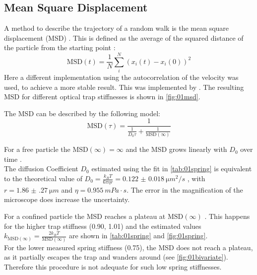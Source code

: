 \documentclass[
    twoside=false,
    twocolumn=true,
    fontsize=11pt,
]{scrarticle}
\begin{document}
\subsection*{Mean Square Displacement}
A method to describe the trajectory of a random walk is the mean square displacement (MSD) \cite{wiki:msd}.
This is defined as the average of the squared distance of the particle from the starting point \cite{wiki:msd}:
\begin{equation}
    \text{MSD}(t) = \frac{1}{N} \sum_i^N \left( x_i\left(t\right) - x_i\left(0\right) \right)^2 
\end{equation}
Here a different implementation using the autocorrelation of the velocity was used, to achieve a more stable result.
This was implemented by \cite{jl:msd}.
The resulting MSD for different optical trap stiffnesses is shown in \autoref{fig:01msd}.

The MSD can be described by the following model:
\begin{equation}
    \text{MSD}(\tau) = \frac{1}{\frac{1}{D_0 \tau} + \frac{1}{\text{MSD}(\infty)}}
    \label{eq:01_mdl_msd} 
\end{equation}

For a free particle the $\text{MSD}(\infty)=\infty$ and the MSD grows linearly with $D_0$ over time \cite{wiki:msd,instructions}.\\
The diffusion Coefficient $D_0$ estimated using the fit in \autoref{tab:01spring} is equivalent to the theoretical value of $D_0 = \frac{k_B T}{6 \pi \eta r} = \SI{0.122(18)}{\micro m ^2 / s}$ \cite{instructions}, with $r = \SI{1.86(27)}{\micro m}$ and $\eta = \SI{0.955}{mPa\cdot s}$\cite{n:water}.
The error in the magnification of the microscope does increase the uncertainty.

For a confined particle the MSD reaches a plateau at $\text{MSD}(\infty)$ \cite{instructions}.
This happens for the higher trap stiffness (\SI{0.90}{}, \SI{1.01}{}) and the estimated values $k_{\text{MSD}(\infty)} = \frac{2 k_B T}{\text{MSD}(\infty)}$ are shown in  \autoref{tab:01spring} and \autoref{fig:01spring}.\\
For the lower measured spring stiffness (\SI{0.75}{}), the MSD does not reach a plateau, as it partially escapes the trap and wanders around (see \autoref{fig:01bivariate}).
Therefore this procedure is not adequate for such low spring stiffnesses.
\end{document}
